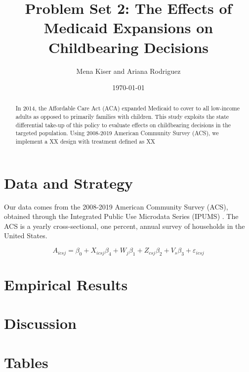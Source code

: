 \documentclass{article}
\title{Problem Set 2: The Effects of Medicaid Expansions on Childbearing Decisions}
\author{Mena Kiser and Ariana Rodriguez}
\date{\today}
\begin{document}
\maketitle

\begin{abstract}
    In 2014, the Affordable Care Act (ACA) expanded Medicaid to cover to all low-income adults as opposed to primarily families with children. This study exploits the state differential take-up of this policy to evaluate effects on childbearing decisions in the targeted population. Using 2008-2019 American Community Survey (ACS), we implement a XX design with treatment defined as XX
\end{abstract}

\section{Data and Strategy}
Our data comes from the 2008-2019 American Community Survey (ACS), obtained through the Integrated Public Use Microdata Series (IPUMS) \citep{data:acs}. The ACS is a yearly cross-sectional, one percent, annual survey of households in the United States. 




\begin{equation}
    A_{icsj} = \beta_0 + X_{icsj}\beta_4 + W_{j}\beta_1 + Z_{csj}\beta_2 + V_{s}\beta_3 + \varepsilon_{icsj}
\end{equation}


\section{Empirical Results}


\section{Discussion}


\newpage


\newpage
\section{Tables}
\end{document}
